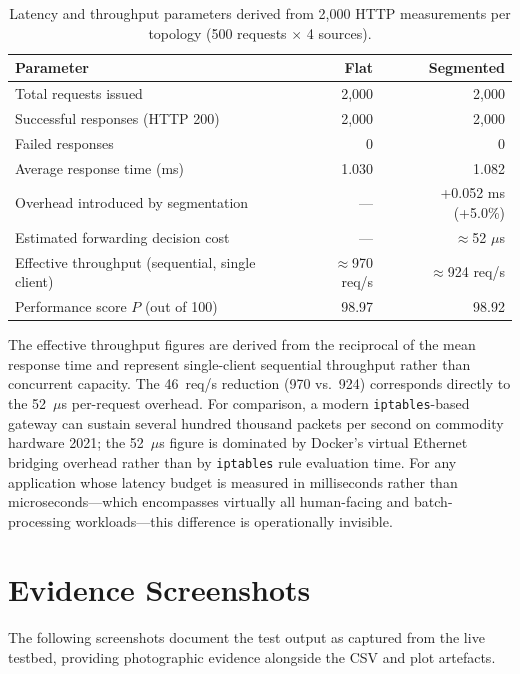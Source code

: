 \begin{table}[H]
\centering
\caption[Detailed latency and throughput parameters]{Latency and throughput parameters derived from 2{,}000 HTTP measurements per topology (500 requests $\times$ 4 sources).}
\label{tab:perf-detail}
\begin{tabularx}{\textwidth}{X r r}
\toprule
\textbf{Parameter} & \textbf{Flat} & \textbf{Segmented} \\
\midrule
Total requests issued & 2{,}000 & 2{,}000 \\
Successful responses (HTTP 200) & 2{,}000 & 2{,}000 \\
Failed responses & 0 & 0 \\
\midrule
Average response time (ms) & 1.030 & 1.082 \\
Overhead introduced by segmentation & --- & +0.052 ms (+5.0\%) \\
Estimated forwarding decision cost & --- & $\approx$52 $\mu$s \\
\midrule
Effective throughput (sequential, single client) & $\approx$970 req/s & $\approx$924 req/s \\
Performance score $P$ (out of 100) & 98.97 & 98.92 \\
\bottomrule
\end{tabularx}
\end{table}

The effective throughput figures are derived from the reciprocal of the mean response time and represent single-client sequential throughput rather than concurrent capacity. The 46~req/s reduction (970 vs.\ 924) corresponds directly to the 52~$\mu$s per-request overhead. For comparison, a modern \texttt{iptables}-based gateway can sustain several hundred thousand packets per second on commodity hardware \parencite{Tanenbaum and Wetherall}{2021}; the 52~$\mu$s figure is dominated by Docker's virtual Ethernet bridging overhead rather than by \texttt{iptables} rule evaluation time. For any application whose latency budget is measured in milliseconds rather than microseconds---which encompasses virtually all human-facing and batch-processing workloads---this difference is operationally invisible.

\section{Evidence Screenshots}
\label{sec:screenshots}

The following screenshots document the test output as captured from the live testbed, providing photographic evidence alongside the CSV and plot artefacts.

